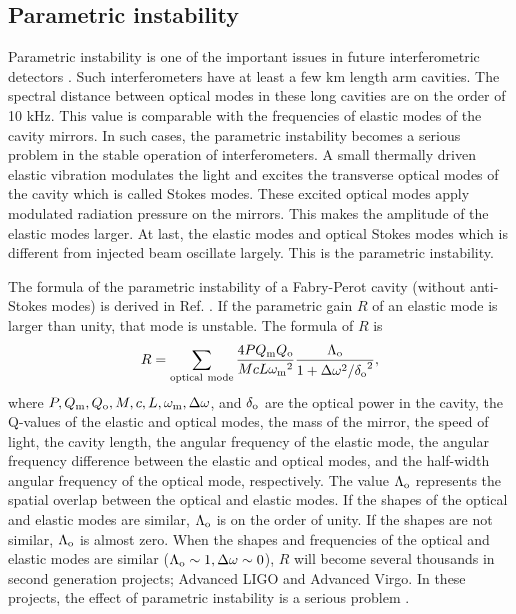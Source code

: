 \FloatBarrier
\subsection{Parametric instability}
\label{sec:opt_layout_PI}

Parametric instability is one of the important issues in future
interferometric detectors \cite{Braginsky2001}. Such interferometers
have at least a few km length arm cavities. The spectral distance between 
optical modes in these long cavities are on the order of 10 kHz.
This value is comparable with the frequencies of elastic modes of
the cavity mirrors. In such cases, the parametric instability
becomes a serious problem in the stable operation of
interferometers. A small thermally driven elastic vibration
modulates the light and excites the transverse optical modes of the
cavity which is called Stokes modes. These excited optical modes apply modulated radiation
pressure on the mirrors. This makes the amplitude of the elastic
modes larger. At last, the elastic modes and optical Stokes modes which is 
different from injected beam oscillate largely. This is the parametric instability.

The formula of the parametric instability of a Fabry-Perot cavity
(without anti-Stokes modes) is derived in Ref. \cite{Braginsky2001}.
If the parametric gain $R$ of an elastic mode is larger than unity, that
mode is unstable. The formula of $R$ is
\begin{equation}
R = \sum_{\rm optical\ mode} \frac{4PQ_{\rm m}Q_{\rm
o}}{McL{\omega_{\rm m}}^2} \frac{\Lambda_{\rm o}}{1+\Delta
\omega^2/{\delta_{\rm o}}^2}, \label{R}
\end{equation}
where $P,Q_{\rm m},Q_{\rm o},M,c,L,\omega_{\rm m},\Delta\omega$,
and $\delta_{\rm o}$ are the optical power in the cavity, the
Q-values of the elastic and optical modes, the mass of the mirror,
the speed of light, the cavity length, the angular frequency of
the elastic mode, the angular frequency difference between the
elastic and optical modes, and the half-width angular frequency of
the optical mode, respectively. The value $\Lambda_{\rm o}$
represents the spatial overlap between the optical and elastic
modes. If the shapes of the optical and elastic modes are similar,
$\Lambda_{\rm o}$ is on the order of unity. If the shapes are not
similar, $\Lambda_{\rm o}$ is almost zero. When the shapes and
frequencies of the optical and elastic modes are similar
($\Lambda_{\rm o} \sim 1, \Delta \omega \sim 0$), $R$ will become
several thousands in second generation projects; Advanced LIGO and 
Advanced Virgo. In these projects, the effect of parametric
instability is a serious problem \cite{Ju2006a,Ju2006b}. 

